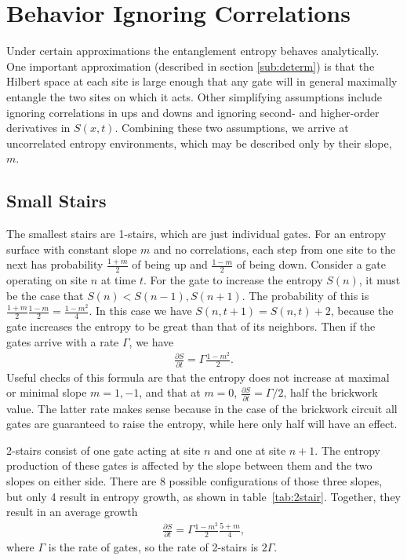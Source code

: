 \documentclass[11pt]{article}
\newcommand{\pd}[2]{\frac{\partial #1}{\partial #2}}
\begin{document}
\section{Behavior Ignoring Correlations} \label{sec:anal}

Under certain approximations the entanglement entropy behaves analytically. One important approximation (described in section \ref{sub:determ}) is that the Hilbert space at each site is large enough that any gate will in general maximally entangle the two sites on which it acts. Other simplifying assumptions include ignoring correlations in ups and downs and ignoring second- and higher-order derivatives in $S(x,t)$. Combining these two assumptions, we arrive at uncorrelated entropy environments, which may be described only by their slope, $m$.

\subsection{Small Stairs} \label{sub:smallstairs} \emph{}

The smallest stairs are 1-stairs, which are just individual gates. For an entropy surface with constant slope $m$ and no correlations, each step from one site to the next has probability $\frac{1+m}{2}$ of being up and $\frac{1-m}{2}$ of being down. Consider a gate operating on site $n$ at time $t$. For the gate to increase the entropy $S(n)$, it must be the case that $S(n)<S(n-1), S(n+1)$. The probability of this is $\frac{1+m}{2} \frac{1-m}{2} = \frac{1-m^2}{4}$. In this case we have $S(n,t+1)=S(n,t)+2$, because the gate increases the entropy to be great than that of its neighbors. Then if the gates arrive with a rate $\Gamma$, we have
\begin{align}
\pd{S}{t} = \Gamma\frac{1-m^2}{2}.
\end{align}
Useful checks of this formula are that the entropy does not increase at maximal or minimal slope $m=1,-1$, and that at $m=0$, $\pd{S}{t}=\Gamma/2$, half the brickwork value. The latter rate makes sense because in the case of the brickwork circuit all gates are guaranteed to raise the entropy, while here only half will have an effect.

2-stairs consist of one gate acting at site $n$ and one at site $n+1$. The entropy production of these gates is affected by the slope between them and the two slopes on either side. There are 8 possible configurations of those three slopes, but only 4 result in entropy growth, as shown in table~\ref{tab:2stair}. Together, they result in an average growth
\begin{align}
\pd{S}{t} = \Gamma\frac{1-m^2}{2}\frac{5+m}{4},
\end{align}
where $\Gamma$ is the rate of gates, so the rate of 2-stairs is $2\Gamma$.
\end{document}
